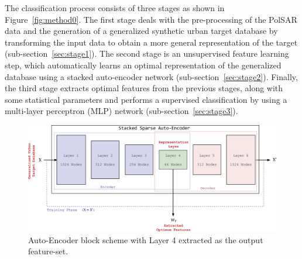The classification process consists of three stages as shown in Figure~\ref{fig:method0}. The first stage deals with the pre-processing of the PolSAR data and the generation of a generalized synthetic urban target database by transforming the input data to obtain a more general representation of the target (sub-section~\ref{sec:stage1}). The second stage is an unsupervised feature learning step, which automatically learns an optimal representation of the generalized database using a stacked auto-encoder network (sub-section~\ref{sec:stage2}). Finally, the third stage extracts optimal features from the previous stages, along with some statistical parameters and performs a supervised classification by using a multi-layer perceptron (MLP) network (sub-section~\ref{sec:stage3}). 






\begin{figure}[!htb]
\centering
	\includegraphics[width = 0.95\columnwidth]{Figures/Trento/Method2}
	\caption[PolSAR data preprocessing Stage 2]{ Auto-Encoder block scheme with Layer 4 extracted as the output feature-set. }
	\label{fig:method2}
\end{figure}



